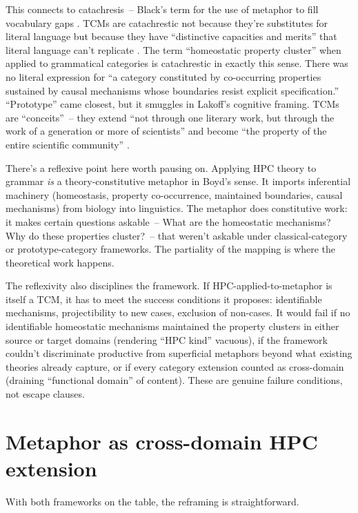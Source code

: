 \documentclass[12pt]{article}
\begin{document}
This connects to catachresis~-- Black's term for the use of metaphor to fill vocabulary gaps \citep[481]{boyd1979}. TCMs are catachrestic not because they're substitutes for literal language but because they have \enquote{distinctive capacities and merits} that literal language can't replicate \citep[482]{boyd1979}. The term \enquote{homeostatic property cluster} when applied to grammatical categories is catachrestic in exactly this sense. There was no literal expression for \enquote{a category constituted by co-occurring properties sustained by causal mechanisms whose boundaries resist explicit specification.} \enquote{Prototype} came closest, but it smuggles in Lakoff's cognitive framing. TCMs are \enquote{conceits}~-- they extend \enquote{not through one literary work, but through the work of a generation or more of scientists} and become \enquote{the property of the entire scientific community} \citep[487--488]{boyd1979}.

There's a reflexive point here worth pausing on. Applying HPC theory to grammar \emph{is} a theory-constitutive metaphor in Boyd's sense. It imports inferential machinery (homeostasis, property co-occurrence, maintained boundaries, causal mechanisms) from biology into linguistics. The metaphor does constitutive work: it makes certain questions askable~-- What are the homeostatic mechanisms? Why do these properties cluster?~-- that weren't askable under classical-category or prototype-category frameworks. The partiality of the mapping is where the theoretical work happens.

The reflexivity also disciplines the framework. If HPC-applied-to-metaphor is itself a TCM, it has to meet the success conditions it proposes: identifiable mechanisms, projectibility to new cases, exclusion of non-cases. It would fail if no identifiable homeostatic mechanisms maintained the property clusters in either source or target domains (rendering \enquote{HPC kind} vacuous), if the framework couldn't discriminate productive from superficial metaphors beyond what existing theories already capture, or if every category extension counted as cross-domain (draining \enquote{functional domain} of content). These are genuine failure conditions, not escape clauses.

\section{Metaphor as cross-domain HPC extension}
\label{sec:reframing}

With both frameworks on the table, the reframing is straightforward.
\end{document}
